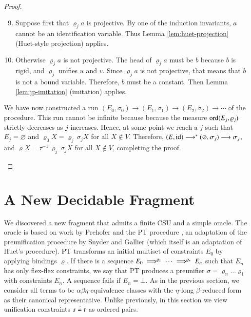 \begin{proof}
\begin{description}
    \begin{enumerate}
    \setcounter{enumi}{8}
    \item Suppose first that $\varrho_j a$ is projective.
    By one of the induction invariants, $a$ cannot be an identification variable.
    Thus Lemma \ref{lem:huet-projection} (Huet-style projection) applies.
    
    \item Otherwise $\varrho_j a$ is not projective. 
    The head of $\varrho_j a$ must be $b$ because $b$ is rigid, and $\varrho_j$ unifies $u$ and $v$. 
    Since $\varrho_j a$ is not projective, that means that $b$ is not a bound variable. 
    Therefore, $b$ must be a constant.
    Then Lemma \ref{lem:jp-imitation} (imitation) applies.
    \end{enumerate}
    
    We have now constructed a run 
    $(E_{0},\sigma_{0})\longrightarrow(E_{1},\sigma_{1})\longrightarrow(E_{2},\sigma_{2})\longrightarrow\cdots$
    of the procedure. 
    This run cannot be infinite because because the measure $\operatorname{ord}(E_j,\varrho_{j})$
    strictly decreases as $j$ increases.
    Hence, at some point we reach a $j$ such
    that $E_{j}=\varnothing$ and $\varrho_{0} X = \varrho_{j}\,\sigma_{j} X$ for all $X \not\in V$.
    Therefore, 
    $(E,\operatorname{id})\longrightarrow^*(\varnothing,\sigma_{j})\longrightarrow\sigma_j$,
    and $\varrho X = \tau^{-1}\,\varrho_{j}\,\sigma_{j} X$ for all $X \not\in V$,
    completing the proof. \qedhere
    \end{description}
    \end{proof}

\pagebreak[2]    
\section{A New Decidable Fragment}
\label{sec:unif:solid-oracle}

We discovered a new fragment that admits a finite CSU and a simple oracle. The
oracle is based on work by Prehofer and the PT procedure \cite{cp-95-unifphd},
an adaptation of the preunification procedure by Snyder and Gallier
\cite{sg-89-unif} (which itself is an adaptation of Huet's procedure). PT
transforms an initial multiset of constraints $E_0$ by applying bindings
$\varrho$. If there is a sequence
$E_0\;\Longrightarrow^{\varrho_1}\;\cdots\;\Longrightarrow^{\varrho_n}\;E_n$ such that $E_n$ has only
flex-flex constraints, we say that PT produces a preunifier $\sigma =
\varrho_n\ldots\varrho_1$ with constraints $E_n$. A sequence fails if
$E_n=\bot$. As in the previous section, we consider all terms to be
$\alpha\beta\eta$-equivalence classes with the $\eta$-long $\beta$-reduced form
as their canonical representative. Unlike previously, in this section we view
unification constraints $s \unif t$ as ordered pairs.

